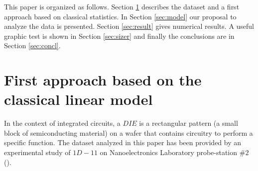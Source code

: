 \documentclass[sn-mathphys]{sn-jnl}%
\theoremstyle{thmstyleone}%
\theoremstyle{thmstyletwo}%
\theoremstyle{thmstylethree}%
\begin{document}



This paper is organized as follows. Section \ref{sec:dataset} describes the dataset and a first approach based on classical statistics. In Section \ref{sec:model} our proposal to analyze the data is presented.  Section \ref{sec:result} gives numerical results. A useful graphic test is shown in Section \ref{sec:sizer} and finally the conclusions are in Section \ref{sec:concl}.

\section{First approach based on the classical linear model} \label{sec:dataset}

In the context of integrated circuits, a $DIE$ is a rectangular pattern (a small block of semiconducting material) on a wafer that contains circuitry to perform a specific function.  
The dataset analyzed in this paper has been provided by an experimental study of { } {$1D-11$} on Nanoelectronics Laboratory probe-station $\# 2$ ({}). 
\end{document}
